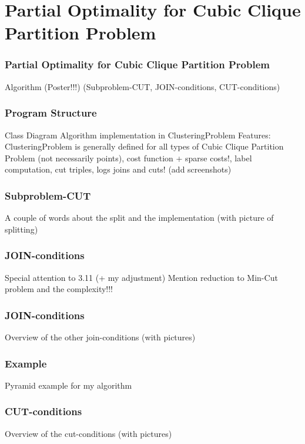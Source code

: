 \section{Partial Optimality for Cubic Clique Partition Problem}
\frame{\tableofcontents[currentsection]}


\begin{frame}
    \frametitle{Partial Optimality for Cubic Clique Partition Problem}
    Algorithm (Poster!!!)
    (Subproblem-CUT, JOIN-conditions, CUT-conditions)
\end{frame}


\begin{frame}
    \frametitle{Program Structure}
    Class Diagram
    Algorithm implementation in ClusteringProblem
    Features: ClusteringProblem is generally defined for all types of Cubic Clique Partition Problem (not necessarily points),
        cost function + sparse costs!, label computation, cut triples,
        logs joins and cuts! (add screenshots)
\end{frame}


\begin{frame}
    \frametitle{Subproblem-CUT}
    A couple of words about the split and the implementation
    (with picture of splitting)
\end{frame}


\begin{frame}
    \frametitle{JOIN-conditions}
    Special attention to 3.11 (+ my adjustment)
    Mention reduction to Min-Cut problem and the complexity!!!
\end{frame}


\begin{frame}
    \frametitle{JOIN-conditions}
    Overview of the other join-conditions (with pictures)
\end{frame}


\begin{frame}
    \frametitle{Example}
    Pyramid example for my algorithm
\end{frame}


\begin{frame}
    \frametitle{CUT-conditions}
    Overview of the cut-conditions (with pictures)
\end{frame}
